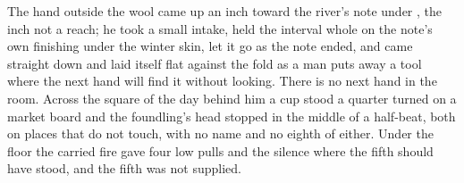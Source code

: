 The hand outside the wool came up an inch toward the river's note under , the inch not a reach; he took a small intake, held the interval whole on the note's own finishing under the winter skin, let it go as the note ended, and came straight down and laid itself flat against the fold as a man puts away a tool where the next hand will find it without looking. There is no next hand in the room. Across the square of the day behind him a cup stood a quarter turned on a market board and the foundling's head stopped in the middle of a half-beat, both on places that do not touch, with no name and no eighth of either. Under the floor the carried fire gave four low pulls and the silence where the fifth should have stood, and the fifth was not supplied.
